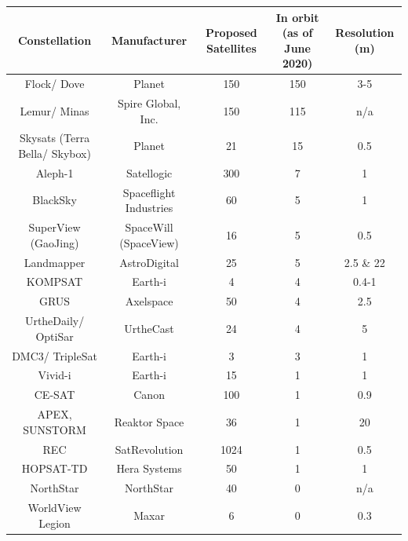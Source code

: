 \bigskip
\begin{center}
\vspace{3mm}
\begin{adjustbox}{width=0.9\textwidth}
\begin{tabular}{||c| c |c |c |c||}
\hline
\textbf{Constellation} & \textbf{Manufacturer} & \textbf{Proposed Satellites} & \textbf{In orbit} (as of June 2020) & \textbf{Resolution (m)}\\
\hline \hline
Flock/ Dove & Planet & 150 & 150 & 3-5\\%
Lemur/ Minas & Spire Global, Inc. & 150 & 115 & n/a\\
Skysats (Terra Bella/ Skybox) & Planet & 21 & 15 & 0.5\\
Aleph-1 & Satellogic & 300 & 7 & 1\\ %
BlackSky & Spaceflight Industries & 60 & 5 & 1\\%
SuperView (GaoJing) & SpaceWill (SpaceView) & 16 & 5 & 0.5\\%
Landmapper & AstroDigital & 25 & 5 & 2.5 \& 22\\
KOMPSAT & Earth-i & 4 & 4 & 0.4-1\\
GRUS & Axelspace & 50 & 4 & 2.5\\
UrtheDaily/ OptiSar & UrtheCast & 24 & 4 & 5\\
DMC3/ TripleSat & Earth-i & 3 & 3 & 1\\
Vivid-i & Earth-i & 15 & 1 & 1\\
CE-SAT & Canon & 100 & 1 & 0.9\\%
APEX, SUNSTORM & Reaktor Space & 36 & 1 & 20\\%
REC & SatRevolution & 1024 & 1 & 0.5\\
HOPSAT-TD & Hera Systems & 50 & 1 & 1\\
NorthStar & NorthStar & 40 & 0 & n/a\\%
WorldView Legion & Maxar & 6 & 0 & 0.3\\%
\hline
\end{tabular}
\label{table:EO}
\end{adjustbox}
\end{center}
\bigskip

